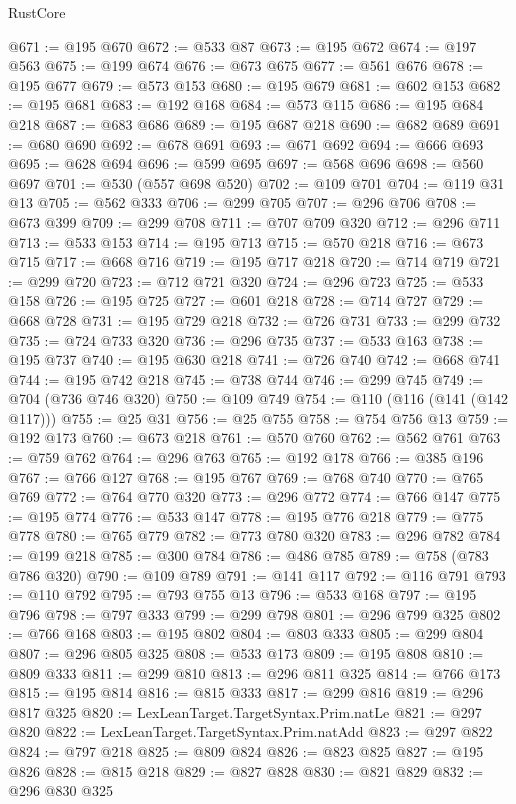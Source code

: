 \begin{lexlean}{RustCore}
\begin{coremodule}
@671 := @195 @670
@672 := @533 @87
@673 := @195 @672
@674 := @197 @563
@675 := @199 @674
@676 := @673 @675
@677 := @561 @676
@678 := @195 @677
@679 := @573 @153
@680 := @195 @679
@681 := @602 @153
@682 := @195 @681
@683 := @192 @168
@684 := @573 @115
@686 := @195 @684 @218
@687 := @683 @686
@689 := @195 @687 @218
@690 := @682 @689
@691 := @680 @690
@692 := @678 @691
@693 := @671 @692
@694 := @666 @693
@695 := @628 @694
@696 := @599 @695
@697 := @568 @696
@698 := @560 @697
@701 := @530 (@557 @698 @520)
@702 := @109 @701
@704 := @119 @31 @13
@705 := @562 @333
@706 := @299 @705
@707 := @296 @706
@708 := @673 @399
@709 := @299 @708
@711 := @707 @709 @320
@712 := @296 @711
@713 := @533 @153
@714 := @195 @713
@715 := @570 @218
@716 := @673 @715
@717 := @668 @716
@719 := @195 @717 @218
@720 := @714 @719
@721 := @299 @720
@723 := @712 @721 @320
@724 := @296 @723
@725 := @533 @158
@726 := @195 @725
@727 := @601 @218
@728 := @714 @727
@729 := @668 @728
@731 := @195 @729 @218
@732 := @726 @731
@733 := @299 @732
@735 := @724 @733 @320
@736 := @296 @735
@737 := @533 @163
@738 := @195 @737
@740 := @195 @630 @218
@741 := @726 @740
@742 := @668 @741
@744 := @195 @742 @218
@745 := @738 @744
@746 := @299 @745
@749 := @704 (@736 @746 @320)
@750 := @109 @749
@754 := @110 (@116 (@141 (@142 @117)))
@755 := @25 @31
@756 := @25 @755
@758 := @754 @756 @13
@759 := @192 @173
@760 := @673 @218
@761 := @570 @760
@762 := @562 @761
@763 := @759 @762
@764 := @296 @763
@765 := @192 @178
@766 := @385 @196
@767 := @766 @127
@768 := @195 @767
@769 := @768 @740
@770 := @765 @769
@772 := @764 @770 @320
@773 := @296 @772
@774 := @766 @147
@775 := @195 @774
@776 := @533 @147
@778 := @195 @776 @218
@779 := @775 @778
@780 := @765 @779
@782 := @773 @780 @320
@783 := @296 @782
@784 := @199 @218
@785 := @300 @784
@786 := @486 @785
@789 := @758 (@783 @786 @320)
@790 := @109 @789
@791 := @141 @117
@792 := @116 @791
@793 := @110 @792
@795 := @793 @755 @13
@796 := @533 @168
@797 := @195 @796
@798 := @797 @333
@799 := @299 @798
@801 := @296 @799 @325
@802 := @766 @168
@803 := @195 @802
@804 := @803 @333
@805 := @299 @804
@807 := @296 @805 @325
@808 := @533 @173
@809 := @195 @808
@810 := @809 @333
@811 := @299 @810
@813 := @296 @811 @325
@814 := @766 @173
@815 := @195 @814
@816 := @815 @333
@817 := @299 @816
@819 := @296 @817 @325
@820 := LexLeanTarget.TargetSyntax.Prim.natLe
@821 := @297 @820
@822 := LexLeanTarget.TargetSyntax.Prim.natAdd
@823 := @297 @822
@824 := @797 @218
@825 := @809 @824
@826 := @823 @825
@827 := @195 @826
@828 := @815 @218
@829 := @827 @828
@830 := @821 @829
@832 := @296 @830 @325

\end{coremodule}
\end{lexlean}
